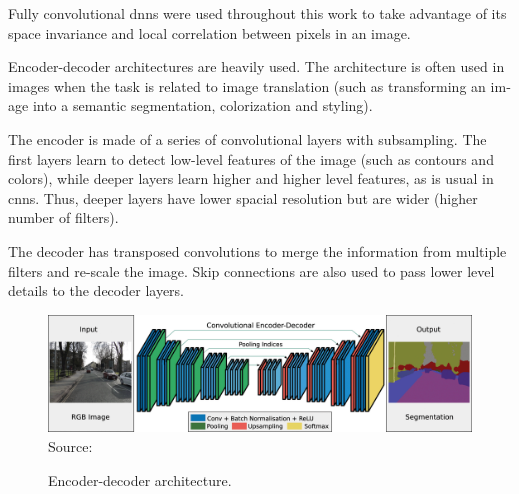 \documentclass[12pt,openright,oneside,a4paper,english, brazilian]{abntex2}
\begin{document}
\begin{otherlanguage}{english}
Fully convolutional \acrshort{dnn}s were used throughout this work to take advantage of its space invariance and local correlation between pixels in an image.

Encoder-decoder architectures are heavily used. The architecture is often used in images when the task is related to image translation (such as transforming an image into a semantic segmentation, colorization and styling).

The encoder is made of a series of convolutional layers with subsampling. The first layers learn to detect low-level features of the image (such as contours and colors), while deeper layers learn higher and higher level features, as is usual in \acrshort{cnn}s. Thus, deeper layers have lower spacial resolution but are wider (higher number of filters).

The decoder has transposed convolutions to merge the information from multiple filters and re-scale the image. Skip connections are also used to pass lower level details to the decoder layers.

\begin{figure}[H]
\centering
\caption{Encoder-decoder architecture.}
\includegraphics[width=\textwidth]{encoder_decoder}
Source: \cite{proposed_segmentation}
\label{segm_prop}
\end{figure}


\end{otherlanguage}
\end{document}

